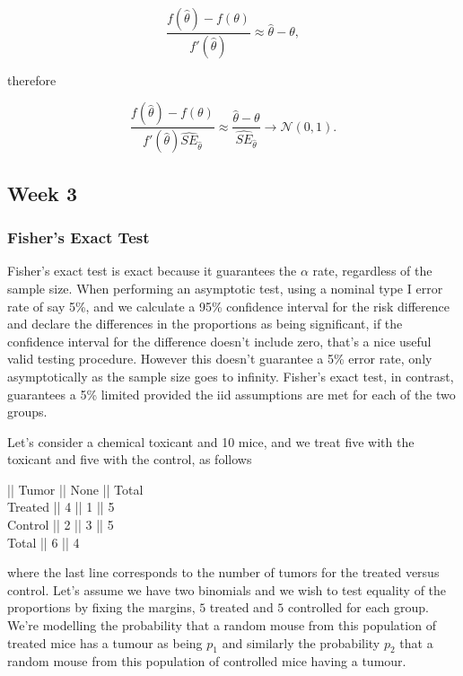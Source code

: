 \documentclass{homework}
\begin{document}
$$
\frac{f(\hat{\theta})-f(\theta)}{f'(\hat{\theta})} \approx {\hat{\theta}-\theta},
$$

therefore 

$$
\frac{f(\hat{\theta})-f(\theta)}{f'(\hat{\theta})\hat{SE}_{\hat{\theta}}} \approx \frac{\hat{\theta}-\theta}{\hat{SE}_{\hat{\theta}}} \rightarrow \mathcal{N}(0,1).
$$

\clearpage

\subsection{Week 3}

\subsubsection{Fisher's Exact Test}

Fisher's exact test is exact because it guarantees the $\alpha$ rate, regardless of the sample size. When performing an asymptotic test, using a nominal type I error rate of say 5\%, and we calculate a 95\% confidence interval for the risk difference and declare the differences in the proportions as being significant, if the confidence interval for the difference doesn't include zero, that's a nice useful valid testing procedure. However this doesn't guarantee a 5\% error rate, only asymptotically as the sample size goes to infinity. Fisher's exact test, in contrast, guarantees a 5\% limited provided the iid assumptions are met for each of the two groups. 

\begin{tcolorbox}[title=Example]

Let's consider a chemical toxicant and 10 mice, and we treat five with the toxicant and five with the control, as follows

|| Tumor || None || Total \\
Treated || 4 || 1 || 5 \\
Control || 2 || 3 || 5 \\
Total || 6 || 4

where the last line corresponds to the number of tumors for the treated versus control. Let's assume we have two binomials and we wish to test equality of the proportions by fixing the margins, $5$ treated and $5$ controlled for each group. We're modelling the probability that a random mouse from this population of treated mice has a tumour as being  $p_1$ and similarly the probability $p_2$ that a random mouse from this population of controlled mice having a tumour. 

\end{tcolorbox}
\end{document}
